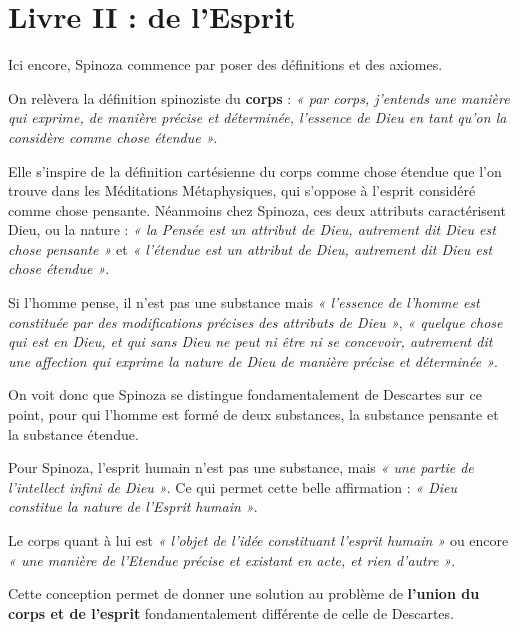 
\section{Livre II : de l’Esprit}

Ici encore, Spinoza commence par poser des définitions et des axiomes.

On relèvera la définition spinoziste du {\bf corps} : {\it « par corps, j’entends une
manière qui exprime, de manière précise et déterminée, l’essence de Dieu en
tant qu’on la considère comme chose étendue »}.

Elle s’inspire de la définition cartésienne du corps comme chose étendue que
l’on trouve dans les Méditations Métaphysiques, qui s’oppose à l’esprit
considéré comme chose pensante. Néanmoins chez Spinoza, ces deux attributs
caractérisent Dieu, ou la nature : {\it « la Pensée est un attribut de Dieu,
autrement dit Dieu est chose pensante »} et {\it « l’étendue est un attribut de Dieu,
autrement dit Dieu est chose étendue »}.

\vspace{0.5cm}
Si l’homme pense, il n’est pas une substance mais {\it « l’essence de l’homme est
constituée par des modifications précises des attributs de Dieu »}, {\it « quelque
chose qui est en Dieu, et qui sans Dieu ne peut ni être ni se concevoir,
autrement dit une affection qui exprime la nature de Dieu de manière précise
et déterminée »}.

On voit donc que Spinoza se distingue fondamentalement de Descartes sur ce
point, pour qui l’homme est formé de deux substances, la substance pensante
et la substance étendue.

\vspace{0.5cm}
Pour Spinoza, l’esprit humain n’est pas une substance, mais {\it « une partie de
l’intellect infini de Dieu »}. Ce qui permet cette belle affirmation : {\it « Dieu
constitue la nature de l’Esprit humain »}.

Le corps quant à lui est {\it « l’objet de l’idée constituant l’esprit humain »} ou
encore {\it « une manière de l’Etendue précise et existant en acte, et rien d’autre »}.

\vspace{0.5cm}
Cette conception permet de donner une solution au problème de {\bf l’union du corps
et de l’esprit} fondamentalement différente de celle de Descartes.

